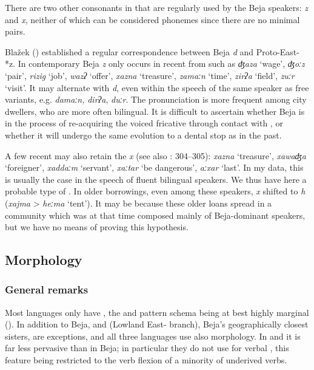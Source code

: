 \documentclass[output=paper]{langsci/langscibook}
\begin{document}
There are two other consonants in   that are regularly used by the Beja speakers: \textit{z} and \textit{x}, neither of which can be considered phonemes since there are no minimal pairs.

Blažek (\citeyear[130]{Blažek2007}) established a regular correspondence between Beja \textit{d} and Proto-East- *z. In contemporary Beja \textit{z} only occurs in recent  from   such as \textit{ʤaza} ‘wage’, \textit{ʤoːz} ‘pair’, \textit{rizig} ‘job’, \textit{wazʔ} ‘offer’, \textit{xazna} ‘treasure’, \textit{zamaːn} ‘time’, \textit{zirʔa} ‘field’, \textit{zuːr} ‘visit’. It may alternate with \textit{d}, even within the speech of the same speaker as free variants, e.g. \textit{damaːn,} \textit{dirʔa}, \textit{duːr}. The  pronunciation is more frequent among city dwellers, who are more often bilingual. It is difficult to ascertain whether Beja is in the process of re-acquiring the voiced fricative through contact with  , or whether it will undergo the same evolution to a dental stop as in the past.

A few recent   may also retain the  \textit{x} (see also \citealt{ManfrediSimeone-SenelleTosco2015}: 304--305): \textit{xazna} ‘treasure’, \textit{xawaʤa} ‘foreigner’, \textit{xaddaːm} ‘servant’, \textit{xaːtar} ‘be dangerous’, \textit{aːxar} ‘last’. In my data, this is usually the case in the speech of fluent bilingual speakers. We thus have here a probable  type of . In older borrowings, even among these speakers,  \textit{x} shifted to \textit{h} (\textit{xajma} > \textit{heːma} ‘tent’). It may be because these older loans spread in a community which was at that time composed mainly of Beja-dominant speakers, but we have no means of proving this hypothesis.


 
 \subsection{Morphology} \label{morphologyv}
 \subsubsection{General remarks}

Most  languages only have , the  and pattern schema being at best highly marginal (\citealt[256]{Cohen1988}). In addition to Beja,  and  (Lowland East- branch), Beja’s geographically closest sisters, are exceptions, and all three languages use also  morphology. In  and  it is far less pervasive than in Beja; in particular they do not use  for verbal , this feature being restricted to the verb flexion of a minority of underived verbs.
\end{document}
